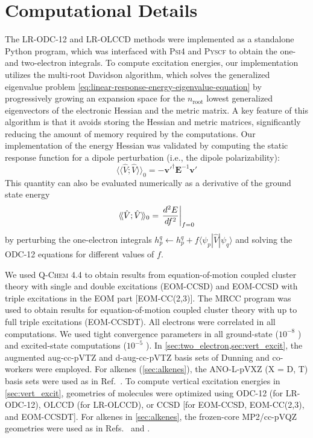 \section{Computational Details}
\label{sec:comp_details}
The LR-ODC-12 and LR-OLCCD methods were implemented as a standalone Python
program, which was interfaced with \textsc{Psi4}\cite{Parrish:2017p3185} and
\textsc{Pyscf}\cite{Sun:2018pe1340} to obtain the one- and two-electron
integrals.
To compute excitation energies, our implementation utilizes the multi-root
Davidson algorithm,\cite{Davidson:1975p87,Liu:1978p49} which solves the
generalized eigenvalue problem
\eqref{eq:linear-response-energy-eigenvalue-equation} by progressively growing
an expansion space for the \(n_\mathrm{root}\) lowest generalized eigenvectors
of the electronic Hessian and the metric matrix.
A key feature of this algorithm is that it avoids storing the Hessian and metric
matrices, significantly reducing the amount of memory required by the
computations.
Our implementation of the energy Hessian was validated by computing the static
response function for a dipole perturbation (i.e., the dipole polarizability):
\begin{equation}
    \langle\!\langle\hat{V}; \hat{V}\rangle\!\rangle_0
    =
    -
    \mathbf{v}'^\dagger
    \mathbf{E}^{-1}
    \mathbf{v}'
\end{equation}
This quantity can also be evaluated numerically as a derivative of the ground state energy
\begin{equation}
    \langle\!\langle\hat{V}; \hat{V}\rangle\!\rangle_0
    =
    \left.
    \frac{%
        d^2 E
    }{%
        df^2
    }
    \right|_{f=0}
\end{equation}
by perturbing the one-electron integrals
\(
    h_p^q
    \leftarrow
    h_p^q
    +
    f\langle \psi_p|\hat{V}|\psi_q\rangle
\)
and solving the ODC-12 equations for different values of \(f\).


We used \textsc{Q-Chem} 4.4\cite{QChem} to obtain results from
equation-of-motion coupled cluster theory with single and double excitations
(EOM-CCSD) and EOM-CCSD with triple excitations in the EOM part [EOM-CC(2,3)].
The \textsc{MRCC} program\cite{MRCC} was used to obtain results for
equation-of-motion coupled cluster theory with up to full triple excitations
(EOM-CCSDT).
All electrons were correlated in all computations.
We used tight convergence parameters in all ground-state ($10^{-8}$ \hartree)
and excited-state computations ($10^{-5}$ \hartree).
In \cref{sec:two_electron,sec:vert_excit}, the augmented aug-cc-pVTZ and
d-aug-cc-pVTZ basis sets of Dunning and co-workers were
employed.\cite{Kendall:1992p6796}
For alkenes (\cref{sec:alkenes}), the ANO-L-pVXZ (X = D, T) basis
sets\cite{Widmark:1990p291} were used as in Ref.~.
To compute vertical excitation energies in \cref{sec:vert_excit}, geometries of
molecules were optimized using ODC-12 (for LR-ODC-12), OLCCD (for LR-OLCCD), or
CCSD [for EOM-CCSD, EOM-CC(2,3), and EOM-CCSDT].
For alkenes in \cref{sec:alkenes}, the frozen-core MP2/cc-pVQZ geometries were
used as in Refs.~ and .


